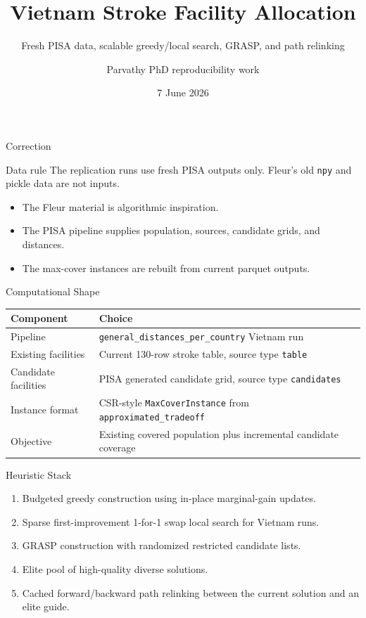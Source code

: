 \documentclass[10pt,aspectratio=169]{beamer}
\title[Vietnam Fresh Replication]{Vietnam Stroke Facility Allocation}
\subtitle{Fresh PISA data, scalable greedy/local search, GRASP, and path relinking}
\author{Parvathy PhD reproducibility work}
\date{7 June 2026}
\newcommand{\code}[1]{\texttt{#1}}
\begin{document}
\begin{frame}\titlepage\end{frame}
\begin{frame}{Correction}
  \begin{block}{Data rule}
    The replication runs use fresh PISA outputs only. Fleur's old \code{npy} and pickle data are not inputs.
  \end{block}
  \begin{itemize}
    \item The Fleur material is algorithmic inspiration.
    \item The PISA pipeline supplies population, sources, candidate grids, and distances.
    \item The max-cover instances are rebuilt from current parquet outputs.
  \end{itemize}
\end{frame}
\begin{frame}{Computational Shape}
  \small
  \begin{tabular}{p{}p{}}
    \toprule
    Component & Choice \\
    \midrule
    Pipeline & \code{general\_distances\_per\_country} Vietnam run \\
    Existing facilities & Current 130-row stroke table, source type \code{table} \\
    Candidate facilities & PISA generated candidate grid, source type \code{candidates} \\
    Instance format & CSR-style \code{MaxCoverInstance} from \code{approximated\_tradeoff} \\
    Objective & Existing covered population plus incremental candidate coverage \\
    \bottomrule
  \end{tabular}
\end{frame}
\begin{frame}{Heuristic Stack}
  \begin{enumerate}
    \item Budgeted greedy construction using in-place marginal-gain updates.
    \item Sparse first-improvement 1-for-1 swap local search for Vietnam runs.
    \item GRASP construction with randomized restricted candidate lists.
    \item Elite pool of high-quality diverse solutions.
    \item Cached forward/backward path relinking between the current solution and an elite guide.
  \end{enumerate}
\end{frame}
\end{document}
